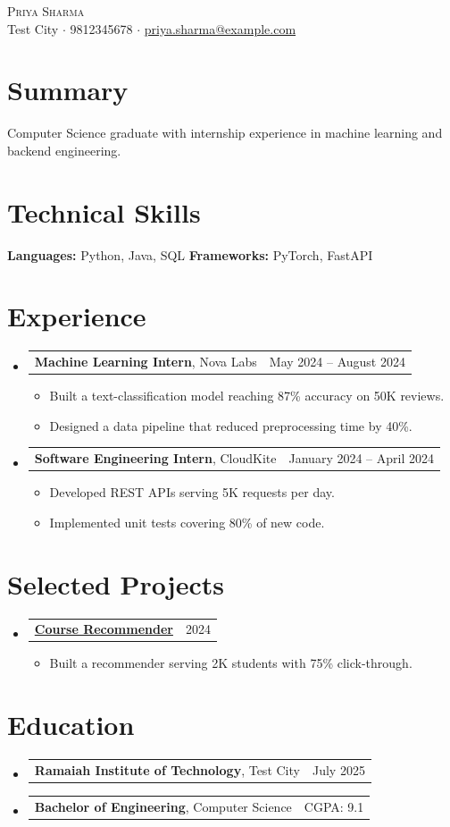 \documentclass[letterpaper,11pt]{article}
\makeatletter
\newcommand{\resumeItem}[1]{%
  \item\small{#1 \vspace{-1pt}}%
}
\newcommand{\resumeSubheading}[3]{%
  \vspace{2pt}\item
    \begin{tabular*}{\linewidth}[t]{l@{\extracolsep{\fill}}r}
      \textbf{#1}, #2 & #3 \\
    \end{tabular*}\vspace{-4pt}%
}
\newcommand{\resumeProjectHeading}[2]{%
    \vspace{2pt}\item
    \begin{tabular*}{\linewidth}{l@{\extracolsep{\fill}}r}
      \small#1 & #2 \\
    \end{tabular*}\vspace{-4pt}%
}
\newcommand{\resumeSubHeadingListStart}{\begin{itemize}[leftmargin=0.15in, label={}, parsep=0pt, topsep=0pt, itemsep=4pt]}
\newcommand{\resumeSubHeadingListEnd}{\end{itemize}}
\newcommand{\resumeItemListStart}{\begin{itemize}[leftmargin=0.15in, parsep=0pt, topsep=2pt, itemsep=3pt, label=$\bullet$]}
\newcommand{\resumeItemListEnd}{\end{itemize}\vspace{-2pt}}
\makeatother
\begin{document}
\begin{center}
{\Huge \scshape Priya Sharma} \\ \vspace{5pt}
\small Test City $\cdot$ 9812345678 $\cdot$ \href{mailto:priya.sharma@example.com}{priya.sharma@example.com}
\end{center}

\section{Summary}
{\small Computer Science graduate with internship experience in machine learning and backend engineering.}

\section{Technical Skills}
\begin{itemize}[leftmargin=0.15in, label={}, parsep=0pt, topsep=0pt, itemsep=0pt]
    \small{\item{
     \textbf{Languages:} Python, Java, SQL
     \textbf{Frameworks:} PyTorch, FastAPI
    }}
\end{itemize}

\section{Experience}
\resumeSubHeadingListStart
\resumeSubheading{Machine Learning Intern}{Nova Labs}{May 2024 -- August 2024}
\resumeItemListStart
\resumeItem{Built a text-classification model reaching 87\% accuracy on 50K reviews.}
\resumeItem{Designed a data pipeline that reduced preprocessing time by 40\%.}
\resumeItemListEnd
\resumeSubheading{Software Engineering Intern}{CloudKite}{January 2024 -- April 2024}
\resumeItemListStart
\resumeItem{Developed REST APIs serving 5K requests per day.}
\resumeItem{Implemented unit tests covering 80\% of new code.}
\resumeItemListEnd
\resumeSubHeadingListEnd

\section{Selected Projects}
\resumeSubHeadingListStart
\resumeProjectHeading{\href{https://github.com/priyasharma/course-recommender}{\textbf{Course Recommender}}}{2024}
\resumeItemListStart
\resumeItem{Built a recommender serving 2K students with 75\% click-through.}
\resumeItemListEnd
\resumeSubHeadingListEnd

\section{Education}
\resumeSubHeadingListStart
\resumeSubheading{Ramaiah Institute of Technology}{Test City}{July 2025}
\vspace{-15pt}
\resumeSubheading{Bachelor of Engineering}{Computer Science}{CGPA: 9.1}
\resumeSubHeadingListEnd
\end{document}
